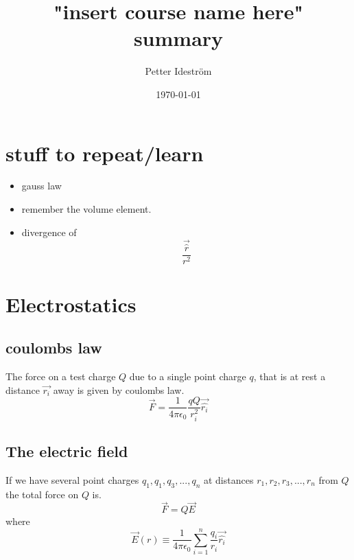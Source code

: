 \documentclass[10pt, A4]{article}
\title{"insert course name here" summary}
\author{Petter Ideström}
\date{\today}
\begin{document}
\begin{titlepage}


\maketitle
\end{titlepage}

\tableofcontents

\newpage 

\section{stuff to repeat/learn }

\begin{itemize}
\item gauss law 
\item remember the volume element. 
\item divergence of 
\begin{equation}
\frac{\vec{\hat{r}}}{r^2}
\end{equation}
\end{itemize}


\section{Electrostatics}

\subsection{coulombs law}

\begin{shaded}
The force on a test charge $Q$ due to a single point charge $q$, that is at rest a distance $\vec{r_i}$ away is given by coulombs law. 
\begin{equation}
\vec{F} = \frac{1}{4\pi \epsilon_0}\frac{qQ}{r_i^2}\vec{\hat{r_i}}
\end{equation}
\end{shaded}

\subsection{The electric field}

\begin{shaded}
If we have several point charges $q_1,q_1,q_3,...,q_n$ at distances $r_1,r_2,r_3,...,r_n$ from $Q$ the total force on $Q$ is. 
\begin{equation}
\vec{F} = Q\vec{E}
\end{equation}
where 
\begin{equation}
\vec{E}(r) \equiv \frac{1}{4\pi \epsilon_0} \sum\limits_{i=1}^n \frac{q_i}{r_i}\vec{\hat{r_i}}
\end{equation}
\end{shaded}
\end{document}
